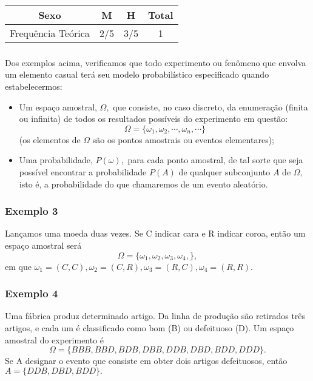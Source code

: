 \documentclass[14pt,aspectratio=1610]{beamer}
\begin{document}
\begin{frame}{}
\frametitle{}
\begin{block}{}
\centering
\begin{tabular}{c|c|c|c}
\hline
Sexo&M&H&Total\\
\hline
Frequência Teórica&2/5&3/5&1\\
\hline
\end{tabular}
\end{block}
\end{frame}

\begin{frame}{}
\frametitle{}
\begin{block}{}
\justifying
Dos exemplos acima, verificamos que todo experimento ou fenômeno que envolva
um elemento casual terá seu modelo probabilístico especificado quando estabelecermos:
\begin{itemize}
\item Um espaço amostral, $\Omega,$ que consiste, no caso discreto, da enumeração (finita ou infinita) de todos os resultados possíveis do experimento em questão:
$$\Omega=\{\omega_{1},\omega_{2},\cdots,\omega_{n},\cdots\}$$
(os elementos de $\Omega$ são os pontos amostrais ou eventos elementares);\pause
\item Uma probabilidade, $P(\omega),$ para cada ponto amostral, de tal sorte que seja possível encontrar a probabilidade $P(A)$ de qualquer subconjunto $A$ de $\Omega,$ isto é, a probabilidade do que chamaremos de um evento aleatório.
\end{itemize}
\end{block}
\end{frame}

\begin{frame}{}
\frametitle{Exemplo 3}
\begin{block}{}
\justifying
Lançamos uma moeda duas vezes. Se C indicar cara e R indicar coroa,
então um espaço amostral será $$\Omega=\{\omega_{1},\omega_{2},\omega_{3},\omega_{4},\},$$
em que $\omega_{1}=(C,C), \omega_{2}=(C,R),\omega_{3}=(R,C), \omega_{4}=(R,R).$ 
\end{block}
\end{frame}

\begin{frame}{}
\frametitle{Exemplo 4}
\begin{block}{}
\justifying
Uma fábrica produz determinado artigo. Da linha de produção são retirados
três artigos, e cada um é classificado como bom (B) ou defeituoso (D). Um
espaço amostral do experimento é
$$\Omega = \{BBB, BBD, BDB, DBB, DDB, DBD, BDD, DDD\}.$$
Se A designar o evento que consiste em obter dois artigos defeituosos, então
$A = \{DDB, DBD, BDD\}.$
\end{block}
\end{frame}
\end{document}
